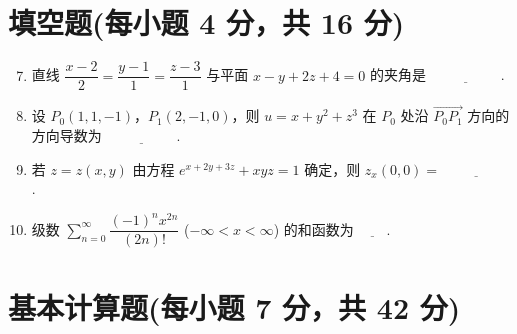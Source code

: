 \documentclass[../Main.tex]{subfiles}
\begin{document}
\section{填空题(每小题 4 分，共 16 分)}
\begin{enumerate}
    \setcounter{enumi}{6}
    \item 直线 \( \dfrac{x-2}{2} = \dfrac{y-1}{1} = \dfrac{z-3}{1} \) 与平面 \( x - y + 2z + 4 = 0 \) 的夹角是 \(\underline{\hspace{5em}}\).
          \vspace{1em}

    \item 设 \( P_0(1,1,-1) \)，\( P_1(2,-1,0) \)，则 \( u = x + y^2 + z^3 \) 在 \( P_0 \) 处沿 \( \overrightarrow{P_0P_1} \) 方向的方向导数为 \(\underline{\hspace{5em}}\).
          \vspace{1em}

    \item 若 \( z = z(x,y) \) 由方程 \( e^{x+2y+3z} + xyz = 1 \) 确定，则 \( z_x(0,0) = \underline{\hspace{5em}}\).
          \vspace{1em}

    \item 级数 \( \sum \limits_{n=0}^{\infty} \dfrac{(-1)^n x^{2n}}{(2n)!} \) (\( -\infty < x < \infty \)) 的和函数为 \(\underline{\quad\quad}\).
          \vspace{1em}
\end{enumerate}

\section{基本计算题(每小题 7 分，共 42 分)}
\end{document}
